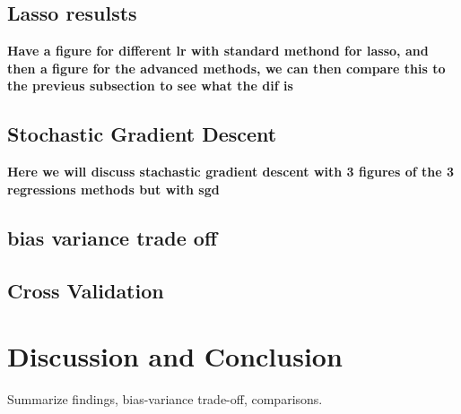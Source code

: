 \documentclass[%
 reprint,            %
 amsmath,amssymb,
 aps,
]{revtex4-2}
\begin{document}





\subsection{Lasso resulsts}
\textbf{Have a figure for different lr with standard methond for lasso, and then a figure for the advanced methods, we can then compare this to the previeus subsection to see what the dif is}



\subsection{Stochastic Gradient Descent}
\textbf{Here we will discuss stachastic gradient descent with 3 figures of the 3 regressions methods but with sgd}




\subsection{bias variance trade off}


\subsection{Cross Validation}


\section{Discussion and Conclusion}
Summarize findings, bias-variance trade-off, comparisons.


\end{document}
